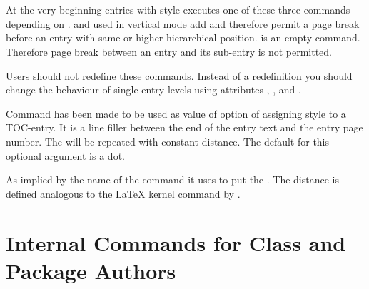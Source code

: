 \begin{Declaration}
  \\
  \\
\end{Declaration}
%
%
%
At the very beginning entries
with style   executes one of these three
commands depending on .  and
 used in vertical mode add
 and therefore permit a
page break before an entry with same or higher hierarchical
position.  is an empty command. Therefore page
break between an entry and its sub-entry is not permitted.

Users should not redefine these commands. Instead of a redefinition you should
change the behaviour of single entry levels using attributes
, , and
.%
%
%
%

\begin{Declaration}
\end{Declaration}
%
Command has been made to be used
as value of option  of assigning style  to a
TOC-entry. It is a line filler between the end of the entry text and the entry
page number. The  will be repeated with constant
distance. The default for this optional argument is a dot.

As implied by the name of the command it uses  to put the
. The distance is defined analogous to the \LaTeX{} kernel
command  by
.%
%
%


\section{Internal Commands for Class and Package Authors}
\label{sec:tocbasic.internals}


